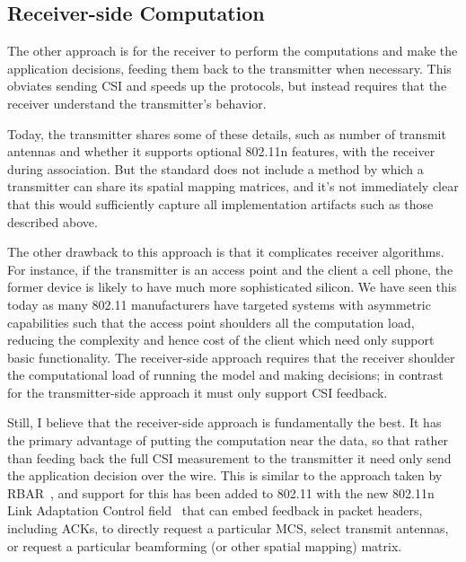 \subsection{Receiver-side Computation}
The other approach is for the receiver to perform the computations and make the application decisions, feeding them back to the transmitter when necessary. This obviates sending CSI and speeds up the protocols, but instead requires that the receiver understand the transmitter's behavior.

Today, the transmitter shares some of these details, such as number of transmit antennas and whether it supports optional 802.11n features, with the receiver during association. But the standard does not include a method by which a transmitter can share its spatial mapping matrices, and it's not immediately clear that this would sufficiently capture all implementation artifacts such as those described above.

The other drawback to this approach is that it complicates receiver algorithms. For instance, if the transmitter is an access point and the client a cell phone, the former device is likely to have much more sophisticated silicon. We have seen this today as many 802.11 manufacturers have targeted systems with asymmetric capabilities such that the access point shoulders all the computation load, reducing the complexity and hence cost of the client which need only support basic functionality. The receiver-side approach requires that the receiver shoulder the computational load of running the model and making decisions; in contrast for the transmitter-side approach it must only support CSI feedback.

Still, I believe that the receiver-side approach is fundamentally the best. It has the primary advantage of putting the computation near the data, so that rather than feeding back the full CSI measurement to the transmitter it need only send the application decision over the wire. This is similar to the approach taken by RBAR~\cite{Holland_RBAR}, and support for this has been added to 802.11 with the new 802.11n Link Adaptation Control field~\cite[\S7.1.3.5a]{80211n} that can embed feedback in packet headers, including ACKs, to directly request a particular MCS, select transmit antennas, or request a particular beamforming (or other spatial mapping) matrix.

